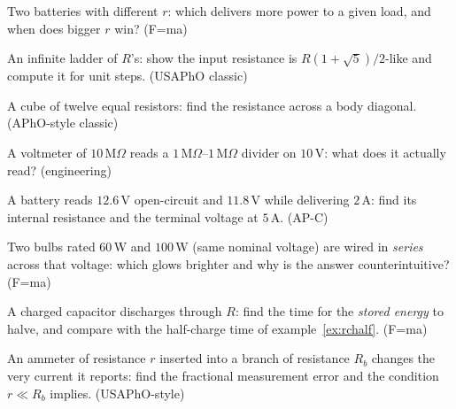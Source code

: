 \begin{exercise}[medium]
Two batteries with different $r$: which delivers more power to a given
load, and when does bigger $r$ win? (F=ma)
\end{exercise}
\begin{exercise}[hard]
An infinite ladder of $R$'s: show the input resistance is
$R(1+\sqrt5)/2$-like and compute it for unit steps. (USAPhO classic)
\end{exercise}
\begin{exercise}[hard]
A cube of twelve equal resistors: find the resistance across a body
diagonal. (APhO-style classic)
\end{exercise}
\begin{exercise}[medium]
A voltmeter of $10$\,M$\Omega$ reads a $1$\,M$\Omega$--$1$\,M$\Omega$
divider on $10$\,V: what does it actually read? (engineering)
\end{exercise}
\begin{exercise}[easy]
A battery reads $12.6$\,V open-circuit and $11.8$\,V while delivering
$2$\,A: find its internal resistance and the terminal voltage at
$5$\,A. (AP-C)
\end{exercise}
\begin{exercise}[medium]
Two bulbs rated $60$\,W and $100$\,W (same nominal voltage) are wired
in \emph{series} across that voltage: which glows brighter and why is
the answer counterintuitive? (F=ma)
\end{exercise}
\begin{exercise}[medium]
A charged capacitor discharges through $R$: find the time for the
\emph{stored energy} to halve, and compare with the half-charge time
of example~\ref{ex:rchalf}. (F=ma)
\end{exercise}
\begin{exercise}[hard]
An ammeter of resistance $r$ inserted into a branch of resistance
$R_b$ changes the very current it reports: find the fractional
measurement error and the condition $r\ll R_b$ implies. (USAPhO-style)
\end{exercise}

